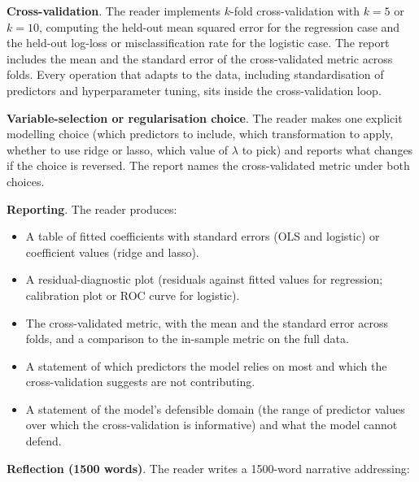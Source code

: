 \begin{project}
\textbf{Cross-validation}. The reader implements $k$-fold
cross-validation with $k = 5$ or $k = 10$, computing the held-out
mean squared error for the regression case and the held-out
log-loss or misclassification rate for the logistic case. The
report includes the mean and the standard error of the
cross-validated metric across folds. Every operation that adapts
to the data, including standardisation of predictors and
hyperparameter tuning, sits inside the cross-validation loop.

\textbf{Variable-selection or regularisation choice}. The reader
makes one explicit modelling choice (which predictors to include,
which transformation to apply, whether to use ridge or lasso,
which value of $\lambda$ to pick) and reports what changes if the
choice is reversed. The report names the cross-validated metric
under both choices.

\textbf{Reporting}. The reader produces:

\begin{itemize}[leftmargin=*]
  \item A table of fitted coefficients with standard errors (OLS
    and logistic) or coefficient values (ridge and lasso).
  \item A residual-diagnostic plot (residuals against fitted
    values for regression; calibration plot or ROC curve for
    logistic).
  \item The cross-validated metric, with the mean and the
    standard error across folds, and a comparison to the
    in-sample metric on the full data.
  \item A statement of which predictors the model relies on most
    and which the cross-validation suggests are not contributing.
  \item A statement of the model's defensible domain (the range of
    predictor values over which the cross-validation is informative)
    and what the model cannot defend.
\end{itemize}

\textbf{Reflection (1500 words)}. The reader writes a 1500-word
narrative addressing:


\end{project}
